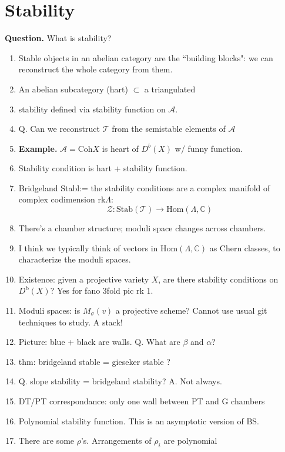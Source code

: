 \section{Stability}
\label{section-stability}

{\bf Question.} What is stability?

\begin{enumerate}
\item Stable objects in an abelian category are the ``building blocks":
we can reconstruct the whole category from them.
\item  An abelian subcategory (hart) $\subset$ a triangulated
\item stability defined via stability function on $\mathcal{A}$.
\item Q. Can we reconstruct $\mathcal{T}$ from the semistable elements of
$\mathcal{A}$
\item {\bf Example.} $\mathcal{A}=\text{Coh}X$ is heart of $D^b(X)$
w/ funny function.
\item Stability condition is hart + stability function.
\item Bridgeland Stabl:= the stability conditions are a complex manifold
of complex codimension $\text{rk}\Lambda$:
$$
 \mathcal{Z}:\text{Stab}(\mathcal{T})
\longrightarrow \text{Hom}(\Lambda,\mathbb{C})
$$
\item There's a chamber structure; moduli space changes across chambers.
\item I think we typically think of vectors in $\text{Hom}(\Lambda,\mathbb{C})$ 
as Chern classes, to characterize the moduli spaces.
\item Existence: given a projective variety $X$, are there stability
conditions on $D^\text{b}(X)$? Yes for fano 3fold pic rk 1.
\item Moduli spaces: is $M_\sigma(v)$ a projective scheme? Cannot use
usual git techniques to study. A stack!
\item Picture: blue + black are walls. Q. What are $\beta$ and $\alpha$?
\item thm: bridgeland stable = gieseker stable ?
\item Q. slope stability = bridgeland stability? A. Not always.
\item DT/PT correspondance: only one wall between PT and G chambers
\medskip
\item Polynomial stability function. This is an asymptotic version of BS.
\item There are some $\rho$'s. Arrangements of $\rho_i$ are polynomial 

\end{enumerate}
